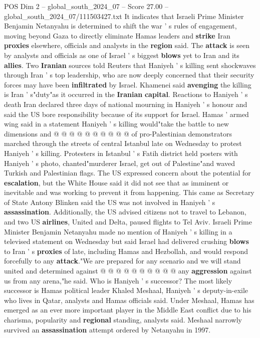 \begin{textsample}{POS Dim 2 – global\_south\_2024\_07 – Score 27.00 – global\_south\_2024\_07/111503427.txt}
It indicates that Israeli Prime Minister Benjamin Netanyahu is determined to shift the war ' s rules of engagement, moving beyond Gaza to directly eliminate Hamas leaders and \textbf{strike} Iran \textbf{proxies} elsewhere, officials and analysts in the \textbf{region} said.
The \textbf{attack} is seen by analysts and officials as one of Israel ' s biggest \textbf{blows} yet to Iran and its \textbf{allies}.
Two \textbf{Iranian} sources told Reuters that Haniyeh ' s killing sent shockwaves through Iran ' s top leadership, who are now deeply concerned that their security forces may have been \textbf{infiltrated} by Israel.
Khamenei said \textbf{avenging} the killing is Iran ' s"duty"as it occurred in the \textbf{Iranian} \textbf{capital}.
Reactions to Haniyeh ' s death Iran declared three days of national mourning in Haniyeh ' s honour and said the US bore responsibility because of its support for Israel.
Hamas ' armed wing said in a statement Haniyeh ' s killing would"take the battle to new dimensions and @ @ @ @ @ @ @ @ @ @ of pro-Palestinian demonstrators marched through the streets of central Istanbul late on Wednesday to protest Haniyeh ' s killing.
Protesters in Istanbul ' s Fatih district held posters with Haniyeh ' s photo, chanted"murderer Israel, get out of Palestine"and waved Turkish and Palestinian flags.
The US expressed concern about the potential for \textbf{escalation}, but the White House said it did not see that as imminent or inevitable and was working to prevent it from happening.
This came as Secretary of State Antony Blinken said the US was not involved in Haniyeh ' s \textbf{assassination}.
Additionally, the US advised citizens not to travel to Lebanon, and two US \textbf{airlines}, United and Delta, paused flights to Tel Aviv.
Israeli Prime Minister Benjamin Netanyahu made no mention of Haniyeh ' s killing in a televised statement on Wednesday but said Israel had delivered crushing \textbf{blows} to Iran ' s \textbf{proxies} of late, including Hamas and Hezbollah, and would respond forcefully to any \textbf{attack}."We are prepared for any scenario and we will stand united and determined against @ @ @ @ @ @ @ @ @ @ any \textbf{aggression} against us from any arena,"he said.
Who is Haniyeh ' s successor?
The most likely successor is Hamas political leader Khaled Meshaal, Haniyeh ' s deputy-in-exile who lives in Qatar, analysts and Hamas officials said.
Under Meshaal, Hamas has emerged as an ever more important player in the Middle East conflict due to his charisma, popularity and \textbf{regional} standing, analysts said.
Meshaal narrowly survived an \textbf{assassination} attempt ordered by Netanyahu in 1997.

\end{textsample}
